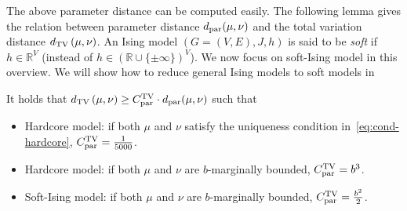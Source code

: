 The above parameter distance can be computed easily.
The following lemma gives the relation between parameter distance $d_\mathrm{par}(\mu,\nu)$ and the total variation distance $d_{\mathrm{TV}}\left({\mu},{\nu}\right)$. 
An Ising model $(G=(V,E),J,h)$ is said to be \emph{soft} if $h \in \mathbb{R}^V$ (instead of $h \in (\mathbb{R} \cup \{\pm \infty\})^V$).
We now focus on soft-Ising model in this overview. 
We will show how to reduce general Ising models to soft models in 
\begin{lemma}\label{lem:TV-lower}
It holds that $d_{\mathrm{TV}}\left({\mu},{\nu}\right) \geq C^\text{TV}_{\mathrm{par}}\cdot d_\mathrm{par}(\mu,\nu)$ such that
\begin{itemize}
    \item Hardcore model: if both $\mu$ and $\nu$ satisfy the uniqueness condition in~\eqref{eq:cond-hardcore}, $C^\text{TV}_{\mathrm{par}} = \frac{1}{5000}$.
    \item Hardcore model: if both $\mu$ and $\nu$ are $b$-marginally bounded, $C^\text{TV}_{\mathrm{par}} = b^3$.
    \item Soft-Ising model: if both $\mu$ and $\nu$ are $b$-marginally bounded, $C^\text{TV}_{\mathrm{par}} = \frac{b^2}{2}$.
\end{itemize}
\end{lemma}
 

